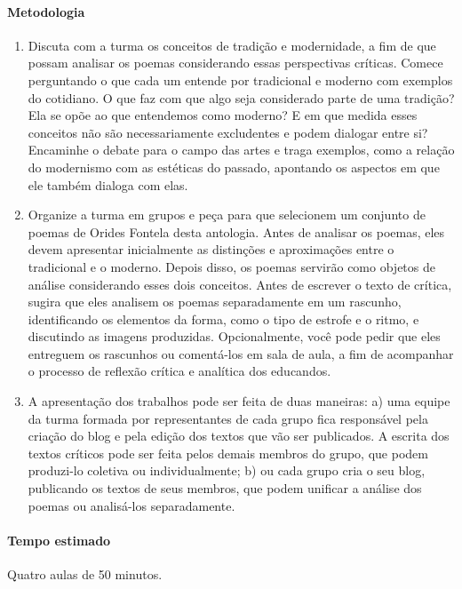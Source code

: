 \documentclass[12pt]{extarticle}
\begin{document}
\paragraph{Metodologia}
\begin{enumerate}
\item Discuta com a turma os conceitos de tradição e
modernidade, a fim de que possam analisar os poemas considerando essas
perspectivas críticas. Comece perguntando o que cada um entende por
tradicional e moderno com exemplos do cotidiano. O que faz com que algo
seja considerado parte de uma tradição? Ela se opõe ao que entendemos
como moderno? E em que medida esses conceitos não são necessariamente
excludentes e podem dialogar entre si? Encaminhe o debate para o campo
das artes e traga exemplos, como a relação do modernismo com as
estéticas do passado, apontando os aspectos em que ele também dialoga
com elas.

\item Organize a turma em grupos e peça para que selecionem um conjunto de
poemas de Orides Fontela desta antologia. Antes de analisar os poemas,
eles devem apresentar inicialmente as distinções e aproximações entre o
tradicional e o moderno. Depois disso, os poemas servirão como objetos
de análise considerando esses dois conceitos. Antes de escrever o texto
de crítica, sugira que eles analisem os poemas separadamente em um
rascunho, identificando os elementos da forma, como o tipo de estrofe e
o ritmo, e discutindo as imagens produzidas. Opcionalmente, você pode
pedir que eles entreguem os rascunhos ou comentá-los em sala de aula, a
fim de acompanhar o processo de reflexão crítica e analítica dos
educandos.

\item A apresentação dos trabalhos pode ser feita de duas maneiras: a) uma
equipe da turma formada por representantes de cada grupo fica
responsável pela criação do blog e pela edição dos textos que vão ser
publicados. A escrita dos textos críticos pode ser feita pelos demais
membros do grupo, que podem produzi-lo coletiva ou individualmente; b)
ou cada grupo cria o seu blog, publicando os textos de seus membros,
que podem unificar a análise dos poemas ou analisá-los separadamente.
\end{enumerate}

\paragraph{Tempo estimado} Quatro aulas de 50 minutos.
\end{document}
